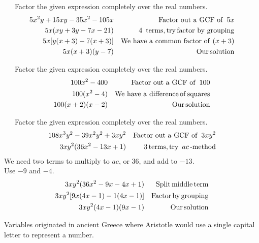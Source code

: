 \begin{example}~~~Factor the given expression completely over the real numbers.
  \begin{eqnarray*}
    5 x^2 y + 15 x y - 35 x^2 - 105 x &  & \operatorname{Factor~out~a~GCF~of~} 5 x\\
    5 x (x y + 3 y - 7 x - 21) &  & 4 \operatorname{~terms}, \operatorname{try}
    \operatorname{factor~by~grouping}\\
    5 x [y (x + 3) - 7 (x + 3)] &  & \operatorname{We~have~a~common~factor~of~}(x + 3)\\
    5 x (x + 3) (y - 7) &  & \operatorname{Our} \operatorname{solution}
  \end{eqnarray*}
\end{example}

\begin{example}~~~Factor the given expression completely over the real numbers.
  \begin{eqnarray*}
    100 x^2 - 400 &  & \operatorname{Factor~out~a~GCF~of~} 100\\
    100 (x^2 - 4) &  & \operatorname{We~have~a~difference} \operatorname{of}
    \operatorname{squares}\\
    100 (x + 2) (x - 2) &  & \operatorname{Our} \operatorname{solution}
  \end{eqnarray*}
\end{example}

\begin{example}~~~Factor the given expression completely over the real numbers.
  \begin{eqnarray*}
    108 x^3 y^2 - 39 x^2 y^2 + 3 x y^2 &  & \operatorname{Factor~out~a~GCF~of~} 3 x y^2\\
    3 x y^2 (36 x^2 - 13 x + 1) &  & 3\operatorname{terms}, \operatorname{try~} ac
    \operatorname{-method}
	\end{eqnarray*}
	We need two terms to multiply to $ac$, or 36, and add to $-13$.\\
	Use $-9$ and $-4$.
  \begin{eqnarray*}
    3 x y^2 (36 x^2 - 9 x - 4 x + 1) &  & \operatorname{Split}
    \operatorname{middle} \operatorname{term}\\
    3 x y^2 [9 x (4 x - 1) - 1 (4 x - 1)] &  & \operatorname{Factor} \operatorname{by}
    \operatorname{grouping}\\
    3 x y^2 (4 x - 1) (9 x - 1) &  & \operatorname{Our} \operatorname{solution}
  \end{eqnarray*}
\end{example}

{} Variables originated in ancient Greece where
Aristotle would use a single capital letter to represent a number.

